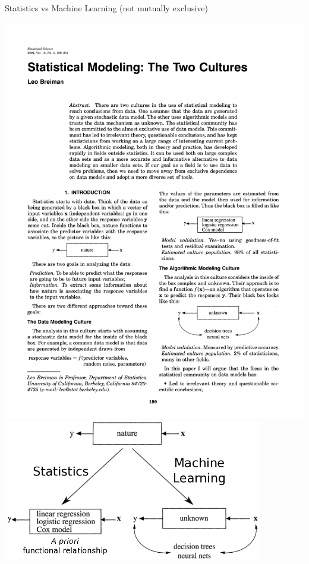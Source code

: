 \documentclass[pdf]{beamer}
\begin{document}
\begin{frame}{Statistics vs Machine Learning (not mutually exclusive)}
\begin{center}
	\includegraphics[width=\textwidth]{breimanPaper.pdf}\\
	\includegraphics[width=0.85\textwidth]{statsvsML.png}
\end{center}
\end{frame}
\end{document}
